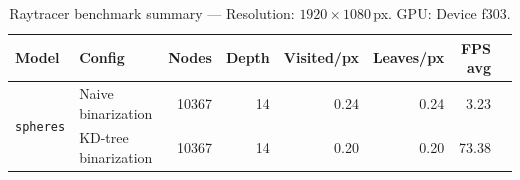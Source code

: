 
\begin{table}[htbp]
  \centering\small
  \setlength{\tabcolsep}{4pt}
  \caption{Raytracer benchmark summary --- Resolution: $1920\times1080$\,px. GPU: Device f303.}
  \label{tab:rt-summary}
  \begin{tabular}{@{}llrrrrrr@{}}
    \toprule
    \textbf{Model} & \textbf{Config} & \textbf{Nodes} & \textbf{Depth} & \textbf{Visited/px} & \textbf{Leaves/px} & \textbf{FPS avg} \\
    \midrule
    \multirow{2}{*}{\texttt{spheres}} & Naive binarization & 10367 & 14 & 0.24 & 0.24 & 3.23 \\
     & KD-tree binarization & 10367 & 14 & 0.20 & 0.20 & 73.38 \\
    \bottomrule
  \end{tabular}
\end{table}
